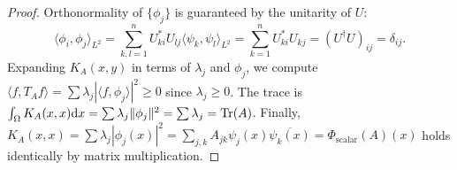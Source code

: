 \documentclass[11pt,a4paper,reqno]{amsart}
\theoremstyle{definition}
\theoremstyle{remark}
\numberwithin{equation}{section}
\newcommand{\dif}{\mathrm{d}}
\begin{document}
\begin{proof}
Orthonormality of $\{\phi_j\}$ is guaranteed by the unitarity of $U$:
\begin{equation}
\langle \phi_i, \phi_j \rangle_{L^2} = \sum_{k, l=1}^n U_{ki}^* U_{lj} \langle \psi_k, \psi_l \rangle_{L^2} = \sum_{k=1}^n U_{ki}^* U_{kj} = (U^\dagger U)_{ij} = \delta_{ij}.
\end{equation}
Expanding $K_A(x, y)$ in terms of $\lambda_j$ and $\phi_j$, we compute $\langle f, T_A f \rangle = \sum \lambda_j |\langle f, \phi_j \rangle|^2 \ge 0$ since $\lambda_j \ge 0$. The trace is $\int_\Omega K_A(x, x) \dif x = \sum \lambda_j \|\phi_j\|^2 = \sum \lambda_j = \Tr(A)$. Finally, $K_A(x, x) = \sum \lambda_j |\phi_j(x)|^2 = \sum_{j,k} A_{jk} \psi_j(x) \overline{\psi_k(x)} = \Phi_{\mathrm{scalar}}(A)(x)$ holds identically by matrix multiplication.
\end{proof}
\end{document}
